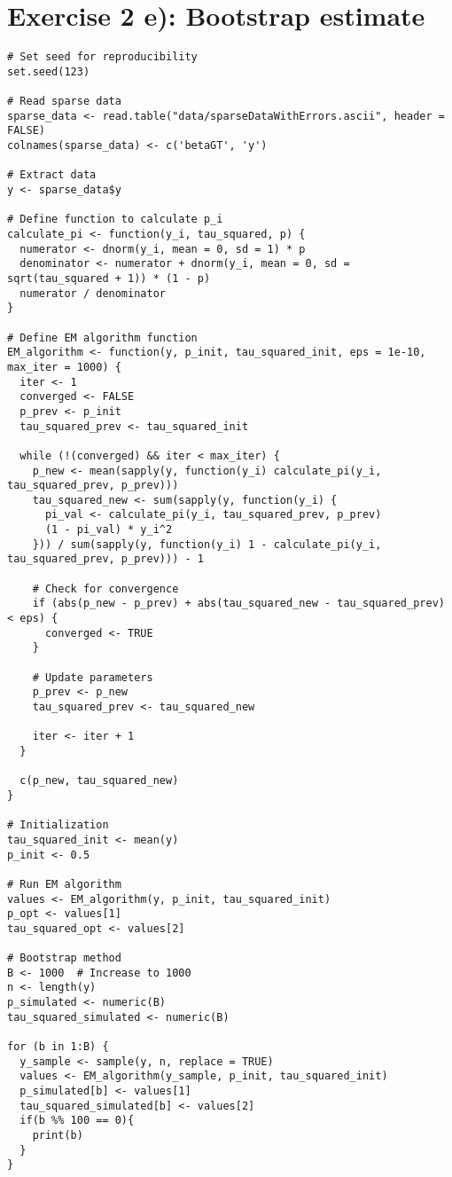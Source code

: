 \section*{Exercise 2 e): Bootstrap estimate}
\begin{tcolorbox}[colback=white!95!black,colframe=white!50!black, breakable]
\begin{lstlisting}[caption={Exercise 2e}, label={lst:tau_p_est}]
# Set seed for reproducibility
set.seed(123)

# Read sparse data
sparse_data <- read.table("data/sparseDataWithErrors.ascii", header = FALSE)
colnames(sparse_data) <- c('betaGT', 'y')

# Extract data
y <- sparse_data$y

# Define function to calculate p_i
calculate_pi <- function(y_i, tau_squared, p) {
  numerator <- dnorm(y_i, mean = 0, sd = 1) * p
  denominator <- numerator + dnorm(y_i, mean = 0, sd = sqrt(tau_squared + 1)) * (1 - p)
  numerator / denominator
}

# Define EM algorithm function
EM_algorithm <- function(y, p_init, tau_squared_init, eps = 1e-10, max_iter = 1000) {
  iter <- 1
  converged <- FALSE
  p_prev <- p_init
  tau_squared_prev <- tau_squared_init
  
  while (!(converged) && iter < max_iter) {
    p_new <- mean(sapply(y, function(y_i) calculate_pi(y_i, tau_squared_prev, p_prev)))
    tau_squared_new <- sum(sapply(y, function(y_i) {
      pi_val <- calculate_pi(y_i, tau_squared_prev, p_prev)
      (1 - pi_val) * y_i^2
    })) / sum(sapply(y, function(y_i) 1 - calculate_pi(y_i, tau_squared_prev, p_prev))) - 1
    
    # Check for convergence
    if (abs(p_new - p_prev) + abs(tau_squared_new - tau_squared_prev) < eps) {
      converged <- TRUE
    }
    
    # Update parameters
    p_prev <- p_new
    tau_squared_prev <- tau_squared_new
    
    iter <- iter + 1
  }
  
  c(p_new, tau_squared_new)
}

# Initialization
tau_squared_init <- mean(y)
p_init <- 0.5

# Run EM algorithm
values <- EM_algorithm(y, p_init, tau_squared_init)
p_opt <- values[1]
tau_squared_opt <- values[2]

# Bootstrap method
B <- 1000  # Increase to 1000
n <- length(y)
p_simulated <- numeric(B)
tau_squared_simulated <- numeric(B)

for (b in 1:B) {
  y_sample <- sample(y, n, replace = TRUE)
  values <- EM_algorithm(y_sample, p_init, tau_squared_init)
  p_simulated[b] <- values[1]
  tau_squared_simulated[b] <- values[2]
  if(b %% 100 == 0){
    print(b)
  }
}


\end{lstlisting}
\end{tcolorbox}

